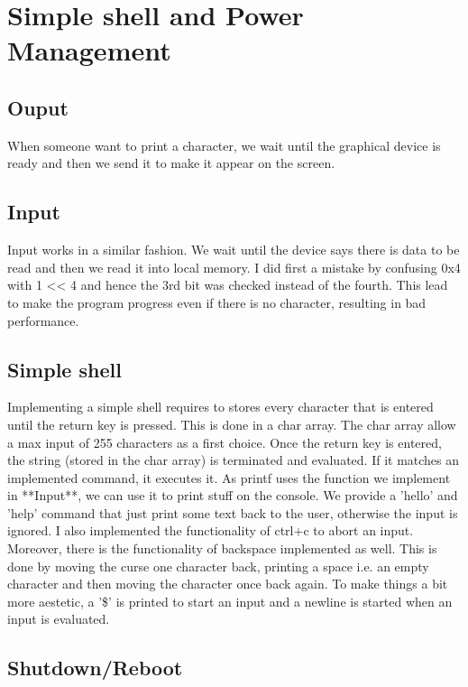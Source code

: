 \chapter{Simple shell and Power Management}

\section{Ouput}

When someone want to print a character, we wait until the graphical device is
ready and then we send it to make it appear on the screen.

\section{Input}

Input works in a similar fashion. We wait until the device says there is data to
be read and then we read it into local memory.  I did first a mistake by
confusing 0x4 with 1 << 4 and hence the 3rd bit was checked instead of the
fourth. This lead to make the program progress even if there is no character,
resulting in bad performance.

\section{Simple shell}

Implementing a simple shell requires to stores every character that is entered
until the return key is pressed. This is done in a char array. The char array
allow a max input of 255 characters as a first choice.  Once the return key is
entered, the string (stored in the char array) is terminated and evaluated. If
it matches an implemented command, it executes it.  As printf uses the function
we implement in **Input**, we can use it to print stuff on the console. We
provide a 'hello' and 'help' command that just print some text back to the user,
otherwise the input is ignored.  I also implemented the functionality of ctrl+c
to abort an input. Moreover, there is the functionality of backspace implemented
as well. This is done by moving the curse one character back, printing a space
i.e. an empty character and then moving the character once back again.  To make
things a bit more aestetic, a '\$' is printed to start an input and a newline is
started when an input is evaluated.

\section{Shutdown/Reboot}

